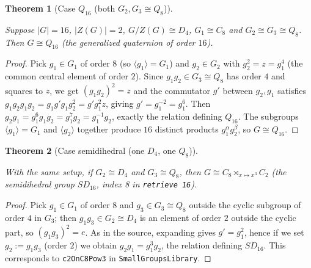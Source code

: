 \documentclass{article}
\newtheorem{theorem}{Theorem}[section]
\theoremstyle{definition}
\newcommand{\lean}[1]{}
\newcommand{\leanok}{}
\newcommand{\leanfile}[1]{}
\newcommand{\uses}[1]{}
\begin{document}
\begin{theorem}[Case $Q_{16}$ (both $G_2, G_3 \cong Q_8$)]
    \label{thm:case-quaternion-sixteen}
    \lean{OrderSixteen.center_two_quaternion}
    \leanfile{M2rGroup7/SixteenCase.lean}
    \uses{lem:one-Gi-cyclic-order-eight, lem:subgroup-product-card}
    \leanok
    Suppose $|G| = 16$, $|Z(G)| = 2$, $G/Z(G) \cong D_4$, $G_1 \cong C_8$
    and $G_2 \cong G_3 \cong Q_8$. Then
    $G \cong Q_{16}$ (the generalized quaternion of order $16$).
\end{theorem}
\begin{proof}
    \uses{lem:one-Gi-cyclic-order-eight,lem:subgroup-product-card}
    Pick $g_1 \in G_1$ of order $8$ (so $\langle g_1\rangle = G_1$) and
    $g_2 \in G_2$ with $g_2^2 = z = g_1^4$ (the common central element of
    order $2$). Since $g_1 g_2 \in G_3 \cong Q_8$ has order $4$ and
    squares to $z$, we get $(g_1 g_2)^2 = z$ and the commutator $g'$
    between $g_2, g_1$ satisfies $g_1 g_2 g_1 g_2 = g_1 g' g_1 g_2^2 =
    g' g_1^2 z$, giving $g' = g_1^{-2} = g_1^6$. Then $g_2 g_1 =
    g_1^{6} g_1 g_2 = g_1^7 g_2 = g_1^{-1} g_2$, exactly the relation
    defining $Q_{16}$. The subgroups $\langle g_1\rangle = G_1$ and
    $\langle g_2 \rangle$ together produce $16$ distinct products
    $g_1^\alpha g_2^\beta$, so $G \cong Q_{16}$.
\end{proof}

\begin{theorem}[Case semidihedral (one $D_4$, one $Q_8$)]
    \label{thm:case-semidihedral}
    \lean{OrderSixteen.center_two_semidihedral}
    \leanfile{M2rGroup7/SixteenCase.lean}
    \uses{lem:one-Gi-cyclic-order-eight, lem:subgroup-product-card}
    \leanok
    With the same setup, if $G_2 \cong D_4$ and $G_3 \cong Q_8$, then
    $G \cong C_8 \rtimes_{x \mapsto x^3} C_2$ (the semidihedral group
    $SD_{16}$, index 8 in \texttt{retrieve 16}).
\end{theorem}
\begin{proof}
    \uses{lem:one-Gi-cyclic-order-eight,lem:subgroup-product-card}
    Pick $g_1 \in G_1$ of order $8$ and $g_3 \in G_3 \cong Q_8$ outside the
    cyclic subgroup of order $4$ in $G_3$; then $g_1 g_3 \in G_2 \cong D_4$
    is an element of order $2$ outside the cyclic part, so $(g_1 g_3)^2 =
    e$. As in the source, expanding gives $g' = g_1^2$, hence if we set
    $g_2 := g_1 g_3$ (order $2$) we obtain $g_2 g_1 = g_1^3 g_2$, the
    relation defining $SD_{16}$. This corresponds to \texttt{c2OnC8Pow3}
    in \texttt{SmallGroupsLibrary}.
\end{proof}
\end{document}
